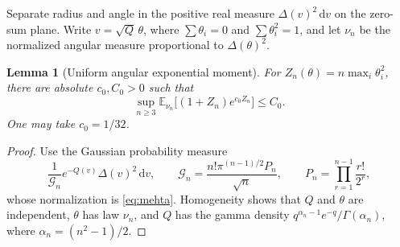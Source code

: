 \documentclass[11pt]{article}
\numberwithin{equation}{section}
\newtheorem{lemma}[theorem]{Lemma}
\theoremstyle{definition}
\newcommand{\dd}{\,\mathrm d}
\begin{document}
Separate radius and angle in the positive real measure
$\Delta(v)^2\dd v$ on the zero-sum plane.  Write
$v=\sqrt Q\,\theta$, where $\sum\theta_i=0$ and
$\sum\theta_i^2=1$, and let $\nu_n$ be the normalized angular
measure proportional to $\Delta(\theta)^2$.

\begin{lemma}[Uniform angular exponential moment]\label{lem:rc-angular}
For $Z_n(\theta)=n\max_i\theta_i^2$, there are absolute
$c_0,C_0>0$ such that
\begin{equation}\label{eq:rc-angular-moment}
 \sup_{n\ge3}\mathbb E_{\nu_n}
       \bigl[(1+Z_n)e^{c_0Z_n}\bigr]\le C_0.
\end{equation}
One may take $c_0=1/32$.
\end{lemma}
\begin{proof}
Use the Gaussian probability measure
\[
 \frac1{\mathcal G_n}e^{-Q(v)}\Delta(v)^2\dd v,
 \qquad
 \mathcal G_n=\frac{n!\pi^{(n-1)/2}P_n}{\sqrt n},\qquad
 P_n=\prod_{r=1}^{n-1}\frac{r!}{2^r},
\]
whose normalization is \eqref{eq:mehta}.  Homogeneity shows that
$Q$ and $\theta$ are independent, $\theta$ has law $\nu_n$, and
$Q$ has the gamma density
$q^{\alpha_n-1}e^{-q}/\Gamma(\alpha_n)$, where
$\alpha_n=(n^2-1)/2$.


\end{proof}
\end{document}
